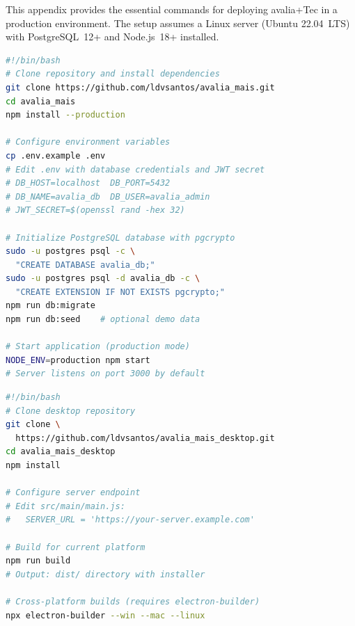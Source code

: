 \documentclass[preprint,12pt,a4paper]{elsarticle}
\begin{document}
This appendix provides the essential commands for deploying avalia+Tec in a production environment. The setup assumes a Linux server (Ubuntu 22.04~LTS) with PostgreSQL~12+ and Node.js~18+ installed.

\begin{lstlisting}[language=sh, caption={Server-side deployment of the avalia+Tec backend and web portal. The script clones the repository, installs dependencies, configures the database, and starts the application.}, label=lst:deploy]
#!/bin/bash
# Clone repository and install dependencies
git clone https://github.com/ldvsantos/avalia_mais.git
cd avalia_mais
npm install --production

# Configure environment variables
cp .env.example .env
# Edit .env with database credentials and JWT secret
# DB_HOST=localhost  DB_PORT=5432
# DB_NAME=avalia_db  DB_USER=avalia_admin
# JWT_SECRET=$(openssl rand -hex 32)

# Initialize PostgreSQL database with pgcrypto
sudo -u postgres psql -c \
  "CREATE DATABASE avalia_db;"
sudo -u postgres psql -d avalia_db -c \
  "CREATE EXTENSION IF NOT EXISTS pgcrypto;"
npm run db:migrate
npm run db:seed    # optional demo data

# Start application (production mode)
NODE_ENV=production npm start
# Server listens on port 3000 by default
\end{lstlisting}

\begin{lstlisting}[language=sh, caption={Building the Electron desktop application for evaluators. Produces platform-specific installers for Windows, macOS, and Linux.}, label=lst:desktopbuild]
#!/bin/bash
# Clone desktop repository
git clone \
  https://github.com/ldvsantos/avalia_mais_desktop.git
cd avalia_mais_desktop
npm install

# Configure server endpoint
# Edit src/main/main.js:
#   SERVER_URL = 'https://your-server.example.com'

# Build for current platform
npm run build
# Output: dist/ directory with installer

# Cross-platform builds (requires electron-builder)
npx electron-builder --win --mac --linux
\end{lstlisting}



\end{document}
